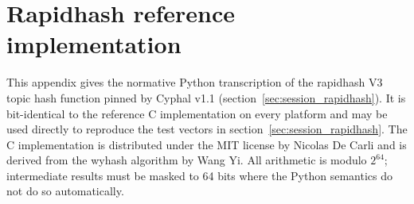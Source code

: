 \chapter{Rapidhash reference implementation}\label{sec:appendix_rapidhash}

This appendix gives the normative Python transcription of the rapidhash V3
topic hash function pinned by Cyphal v1.1
(section~\ref{sec:session_rapidhash}). It is bit-identical to the reference
C implementation on every platform and may be used directly to reproduce
the test vectors in section~\ref{sec:session_rapidhash}.
The C implementation is distributed under the MIT license by Nicolas De
Carli and is derived from the wyhash algorithm by Wang Yi.
All arithmetic is modulo $2^{64}$; intermediate results must be masked to
64 bits where the Python semantics do not do so automatically.

